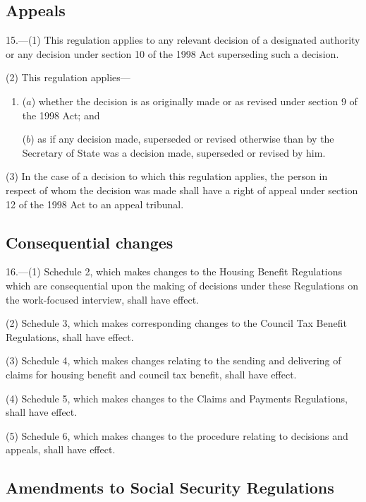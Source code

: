 \documentclass[12pt,a4paper]{article}
\begin{document}
\subsection[15. Appeals]{Appeals}

15.---(1)  This regulation applies to any relevant decision of a designated authority or any decision under section 10 of the 1998 Act superseding such a decision.

(2) This regulation applies—
\begin{enumerate}\item[]
($a$) whether the decision is as originally made or as revised under section 9 of the 1998 Act; and

($b$) as if any decision made, superseded or revised otherwise than by the Secretary of State was a decision made, superseded or revised by him.
\end{enumerate}

(3) In the case of a decision to which this regulation applies, the person in respect of whom the decision was made shall have a right of appeal under section 12 of the 1998 Act to an appeal tribunal.

\subsection[16. Consequential changes]{Consequential changes}

16.---(1)  Schedule 2, which makes changes to the Housing Benefit Regulations which are consequential upon the making of decisions under these Regulations on the work-focused interview, shall have effect.

(2) Schedule 3, which makes corresponding changes to the Council Tax Benefit Regulations, shall have effect.

(3) Schedule 4, which makes changes relating to the sending and delivering of claims for housing benefit and council tax benefit, shall have effect.

(4) Schedule 5, which makes changes to the Claims and Payments Regulations, shall have effect.

(5) Schedule 6, which makes changes to the procedure relating to decisions and appeals, shall have effect.

\subsection[17. Amendments to Social Security Regulations]{Amendments to Social Security Regulations}
\end{document}
